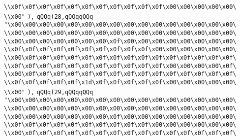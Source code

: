 \verb|\\x0f\x0f\x0f\x0f\x0f\x0f\x0f\x0f\x0f\x0f\x0f\x00\x00\x00\x00\x00\|\newline
\verb|\\x00"|\newline
\verb|),|\newline
\verb|qQQq(28,qQQqqQQq|\newline
\verb|"\x00\x00\x00\x00\x00\x00\x00\x00\x00\x00\x00\x00\x00\x00\x00\x00\|\newline
\verb|\\x00\x00\x00\x00\x00\x00\x00\x00\x00\x00\x00\x00\x00\x00\x00\x00\|\newline
\verb|\\x00\x00\x00\x00\x00\x00\x00\x0f\x00\x00\x00\x00\x00\x00\x00\x00\|\newline
\verb|\\x0f\x0f\x0f\x0f\x0f\x0f\x0f\x0f\x0f\x0f\x00\x00\x00\x00\x00\x00\|\newline
\verb|\\x00\x0f\x0f\x0f\x0f\x0f\x0f\x0f\x0f\x0f\x0f\x0f\x0f\x0f\x0f\x0f\|\newline
\verb|\\x0f\x0f\x0f\x0f\x0f\x0f\x0f\x0f\x0f\x0f\x0f\x00\x00\x00\x00\x0f\|\newline
\verb|\\x00\x0f\x0f\x0f\x0f\x0f\x0f\x0f\x0f\x0f\x0f\x0f\x0f\x0f\x0f\x0f\|\newline
\verb|\\x0f\x0f\x0f\x0f\x0f\x1d\x0f\x0f\x0f\x0f\x0f\x00\x00\x00\x00\x00\|\newline
\verb|\\x00"|\newline
\verb|),|\newline
\verb|qQQq(29,qQQqqQQq|\newline
\verb|"\x00\x00\x00\x00\x00\x00\x00\x00\x00\x00\x00\x00\x00\x00\x00\x00\|\newline
\verb|\\x00\x00\x00\x00\x00\x00\x00\x00\x00\x00\x00\x00\x00\x00\x00\x00\|\newline
\verb|\\x00\x00\x00\x00\x00\x00\x00\x0f\x00\x00\x00\x00\x00\x00\x00\x00\|\newline
\verb|\\x0f\x0f\x0f\x0f\x0f\x0f\x0f\x0f\x0f\x0f\x00\x00\x00\x00\x00\x00\|\newline
\verb|\\x00\x0f\x0f\x0f\x0f\x0f\x0f\x0f\x0f\x0f\x0f\x0f\x0f\x0f\x0f\x0f\|\newline
